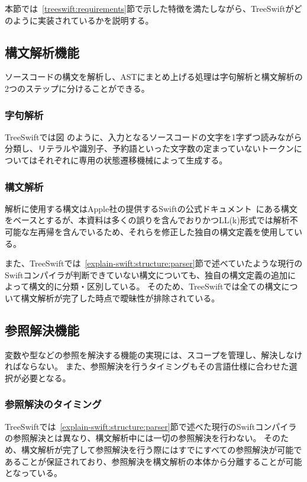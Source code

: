 本節では~\ref{treeswift:requirements}節で示した特徴を満たしながら、TreeSwiftがどのように実装されているかを説明する。


\subsection{構文解析機能}

ソースコードの構文を解析し、ASTにまとめ上げる処理は字句解析と構文解析の2つのステップに分けることができる。

\subsubsection{字句解析}

TreeSwiftでは図%
のように、入力となるソースコードの文字を1字ずつ読みながら分類し、リテラルや識別子、予約語といった文字数の定まっていないトークンについてはそれぞれに専用の状態遷移機械によって生成する。

\subsubsection{構文解析}

解析に使用する構文はApple社の提供するSwiftの公式ドキュメント~\cite{swift-grammar}にある構文をベースとするが、本資料は多くの誤りを含んでおりかつLL(k)形式では解析不可能な左再帰を含んでいるため、それらを修正した独自の構文定義を使用している。

また、TreeSwiftでは~\ref{explain-swift:structure:parser}節で述べていたような現行のSwiftコンパイラが判断できていない構文についても、独自の構文定義の追加によって構文的に分類・区別している。
そのため、TreeSwiftでは全ての構文について構文解析が完了した時点で曖昧性が排除されている。


\subsection{参照解決機能}

変数や型などの参照を解決する機能の実現には、スコープを管理し、解決しなければならない。
また、参照解決を行うタイミングもその言語仕様に合わせた選択が必要となる。

\subsubsection{参照解決のタイミング}

TreeSwiftでは~\ref{explain-swift:structure:parser}節で述べた現行のSwiftコンパイラの参照解決とは異なり、構文解析中には一切の参照解決を行わない。
そのため、構文解析が完了して参照解決を行う際にはすでにすべての参照解決が可能であることが保証されており、参照解決を構文解析の本体から分離することが可能となっている。

